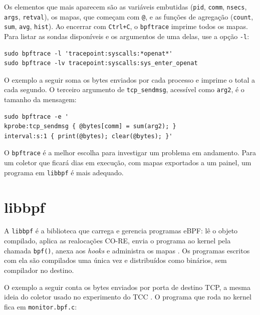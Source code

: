 Os elementos que mais aparecem são as variáveis embutidas (\texttt{pid}, \texttt{comm}, \texttt{nsecs}, \texttt{args}, \texttt{retval}), os mapas, que começam com \texttt{@}, e as funções de agregação (\texttt{count}, \texttt{sum}, \texttt{avg}, \texttt{hist}). Ao encerrar com \texttt{Ctrl+C}, o \texttt{bpftrace} imprime todos os mapas. Para listar as sondas disponíveis e os argumentos de uma delas, use a opção \texttt{-l}:

\begin{lstlisting}
sudo bpftrace -l 'tracepoint:syscalls:*openat*'
sudo bpftrace -lv tracepoint:syscalls:sys_enter_openat
\end{lstlisting}

O exemplo a seguir soma os bytes enviados por cada processo e imprime o total a cada segundo. O terceiro argumento de \texttt{tcp\_sendmsg}, acessível como \texttt{arg2}, é o tamanho da mensagem:

\begin{lstlisting}
sudo bpftrace -e '
kprobe:tcp_sendmsg { @bytes[comm] = sum(arg2); }
interval:s:1 { print(@bytes); clear(@bytes); }'
\end{lstlisting}

O \texttt{bpftrace} é a melhor escolha para investigar um problema em andamento. Para um coletor que ficará dias em execução, com mapas exportados a um painel, um programa em \texttt{libbpf} é mais adequado.

\section{libbpf}\label{sec:libbpf}

A \texttt{libbpf} é a biblioteca que carrega e gerencia programas eBPF: lê o objeto compilado, aplica as realocações CO-RE, envia o programa ao kernel pela chamada \texttt{bpf()}, anexa aos \textit{hooks} e administra os mapas \cite{libbpf}. Os programas escritos com ela são compilados uma única vez e distribuídos como binários, sem compilador no destino.

O exemplo a seguir conta os bytes enviados por porta de destino TCP, a mesma ideia do coletor usado no experimento do TCC \cite{alves2026tcc}. O programa que roda no kernel fica em \texttt{monitor.bpf.c}:

